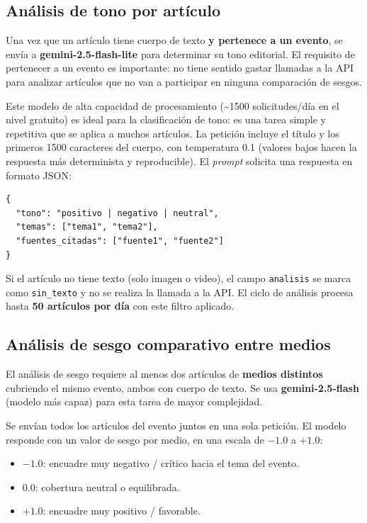 \documentclass[12pt,a4paper]{article}
\begin{document}
\subsection{Análisis de tono por artículo}

Una vez que un artículo tiene cuerpo de texto \textbf{y pertenece a un evento}, se envía a \textbf{gemini-2.5-flash-lite} para determinar su tono editorial. El requisito de pertenecer a un evento es importante: no tiene sentido gastar llamadas a la API para analizar artículos que no van a participar en ninguna comparación de sesgos.

Este modelo de alta capacidad de procesamiento (\textasciitilde{}1500 solicitudes/día en el nivel gratuito) es ideal para la clasificación de tono: es una tarea simple y repetitiva que se aplica a muchos artículos. La petición incluye el título y los primeros 1500 caracteres del cuerpo, con temperatura 0.1 (valores bajos hacen la respuesta más determinista y reproducible). El \textit{prompt} solicita una respuesta en formato JSON:

\begin{lstlisting}[caption=Esquema de respuesta de análisis de tono]
{
  "tono": "positivo | negativo | neutral",
  "temas": ["tema1", "tema2"],
  "fuentes_citadas": ["fuente1", "fuente2"]
}
\end{lstlisting}

Si el artículo no tiene texto (solo imagen o video), el campo \texttt{analisis} se marca como \texttt{sin\_texto} y no se realiza la llamada a la API. El ciclo de análisis procesa hasta \textbf{50 artículos por día} con este filtro aplicado.

\subsection{Análisis de sesgo comparativo entre medios}

El análisis de sesgo requiere al menos dos artículos de \textbf{medios distintos} cubriendo el mismo evento, ambos con cuerpo de texto. Se usa \textbf{gemini-2.5-flash} (modelo más capaz) para esta tarea de mayor complejidad.

Se envían todos los artículos del evento juntos en una sola petición. El modelo responde con un valor de sesgo por medio, en una escala de $-1.0$ a $+1.0$:

\begin{itemize}[nosep]
  \item $-1.0$: encuadre muy negativo / crítico hacia el tema del evento.
  \item $0.0$: cobertura neutral o equilibrada.
  \item $+1.0$: encuadre muy positivo / favorable.
\end{itemize}
\end{document}
